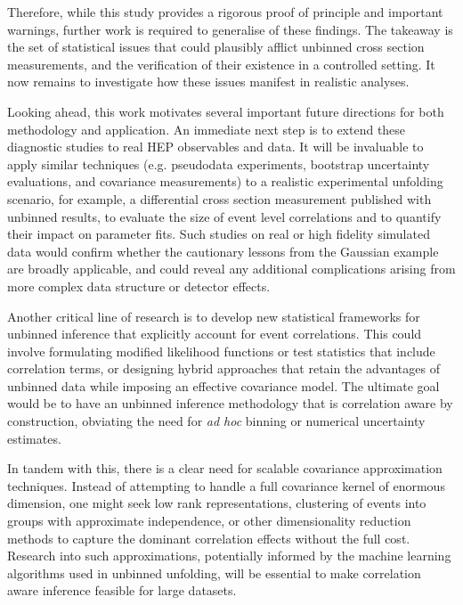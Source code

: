     Therefore, while this study provides a rigorous proof of principle and important warnings, further work is required to generalise of these findings.
    The takeaway is the set of statistical issues that could plausibly afflict unbinned cross section measurements, and the verification of their existence in a controlled setting.
    It now remains to investigate how these issues manifest in realistic analyses.

    Looking ahead, this work motivates several important future directions for both methodology and application.
    An immediate next step is to extend these diagnostic studies to real HEP observables and data.
    It will be invaluable to apply similar techniques (e.g. pseudodata experiments, bootstrap uncertainty evaluations, and covariance measurements) to a realistic experimental unfolding scenario, for example, a differential cross section measurement published with unbinned results, to evaluate the size of event level correlations and to quantify their impact on parameter fits.
    Such studies on real or high fidelity simulated data would confirm whether the cautionary lessons from the Gaussian example are broadly applicable, and could reveal any additional complications arising from more complex data structure or detector effects.
    
    Another critical line of research is to develop new statistical frameworks for unbinned inference that explicitly account for event correlations.
    This could involve formulating modified likelihood functions or test statistics that include correlation terms, or designing hybrid approaches that retain the advantages of unbinned data while imposing an effective covariance model.
    The ultimate goal would be to have an unbinned inference methodology that is correlation aware by construction, obviating the need for \textit{ad hoc} binning or numerical uncertainty estimates.
    
    In tandem with this, there is a clear need for scalable covariance approximation techniques.
    Instead of attempting to handle a full covariance kernel of enormous dimension, one might seek low rank representations, clustering of events into groups with approximate independence, or other dimensionality reduction methods to capture the dominant correlation effects without the full cost.
    Research into such approximations, potentially informed by the machine learning algorithms used in unbinned unfolding, will be essential to make correlation aware inference feasible for large datasets.
    
